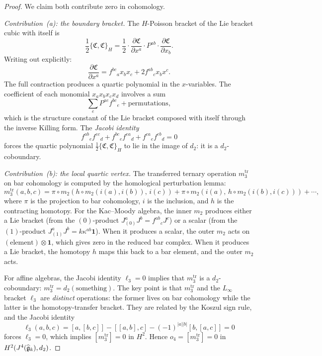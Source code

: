 \begin{proof}
We claim both contribute zero in cohomology.

\emph{Contribution~(a): the boundary bracket.}
The $H$-Poisson bracket of the Lie bracket cubic with
itself is
\begin{equation}%
\frac{1}{2}\{\mathfrak{C}, \mathfrak{C}\}_H
= \frac{1}{2} \cdot
\frac{\partial \mathfrak{C}}{\partial x^a}
\cdot P^{ab} \cdot
\frac{\partial \mathfrak{C}}{\partial x_b}.
\end{equation}
Writing out explicitly:
\[
\frac{\partial \mathfrak{C}}{\partial x^a}
= f^{bc}{}_a x_b x_c + 2f^{ab}{}_c x_b x^c.
\]
The full contraction produces a quartic polynomial in
the $x$-variables. The coefficient of each monomial
$x_a x_b x_c x_d$ involves a sum
\[
\sum_e P^{ae}f^{bc}{}_e + \text{permutations},
\]
which is the structure constant of the Lie bracket
composed with itself through the inverse Killing form.
The \emph{Jacobi identity}
\begin{equation}%
f^{ab}{}_e f^{ec}{}_d + f^{bc}{}_e f^{ea}{}_d
+ f^{ca}{}_e f^{eb}{}_d = 0
\end{equation}
forces the quartic polynomial
$\frac{1}{2}\{\mathfrak{C}, \mathfrak{C}\}_H$ to
lie in the image of $d_2$: it is a $d_2$-coboundary.

\emph{Contribution~(b): the local quartic vertex.}
The transferred ternary operation $m_3^{\mathrm{tr}}$ on
bar cohomology is computed by the homological perturbation
lemma:
\[
m_3^{\mathrm{tr}}(a,b,c) =
\pi \circ m_2(h \circ m_2(i(a), i(b)),\, i(c))
+ \pi \circ m_2(i(a),\, h \circ m_2(i(b), i(c)))
+ \cdots,
\]
where $\pi$ is the projection to bar cohomology, $i$ is
the inclusion, and $h$ is the contracting homotopy.
For the Kac--Moody algebra, the inner $m_2$ produces
either a Lie bracket (from the $(0)$-product
$J^a_{(0)}J^b = f^{ab}{}_c J^c$) or a scalar (from the
$(1)$-product $J^a_{(1)}J^b = k\kappa^{ab}\mathbf{1}$).
When it produces a scalar, the outer $m_2$ acts on
$(\text{element}) \otimes \mathbf{1}$, which gives zero
in the reduced bar complex. When it produces a Lie
bracket, the homotopy $h$ maps this back to a bar element,
and the outer $m_2$ acts.

For affine algebras, the Jacobi identity $\ell_3 = 0$
implies that $m_3^{\mathrm{tr}}$ is a $d_2$-coboundary:
$m_3^{\mathrm{tr}} = d_2(\text{something})$. The key
point is that $m_3^{\mathrm{tr}}$ and the $L_\infty$
bracket $\ell_3$ are \emph{distinct} operations: the
former lives on bar cohomology while the latter is the
homotopy-transfer bracket. They are related by the
Koszul sign rule, and the Jacobi identity
\begin{equation}%
\ell_3(a, b, c) = [a, [b, c]] - [[a,b], c]
- (-1)^{|a||b|}[b,[a,c]] = 0
\end{equation}
forces $\ell_3 = 0$, which implies $[m_3^{\mathrm{tr}}]
= 0$ in $H^2$. Hence $o_4 = [m_3^{\mathrm{tr}}] = 0$
in $H^2(J^4(\widehat{\mathfrak{g}}_k), d_2)$.


\end{proof}

